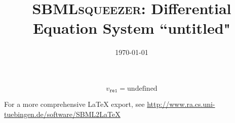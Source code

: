 \documentclass[11pt,a4paper]{scrartcl}
\title{\textsc{SBMLsqueezer}: Differential Equation System ``untitled"}
\date{\today}
\begin{document}
\author{}
\maketitle
\begin{equation*}
v_\mathtt{re1}=  \mathrm{undefined} 
\end{equation*}
\begin{center} For a more comprehensive \LaTeX{} export, see \url{http://www.ra.cs.uni-tuebingen.de/software/SBML2LaTeX}\end{center}
\end{document}
